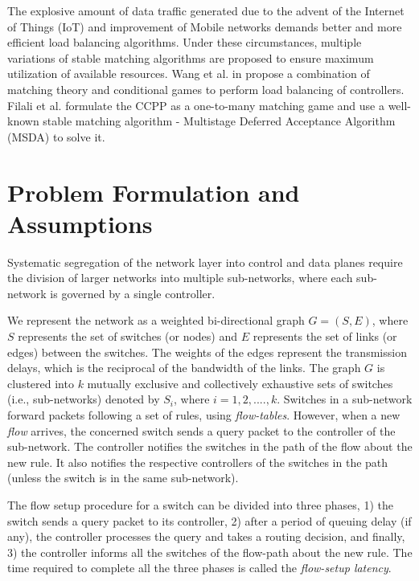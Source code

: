 \documentclass[a4paper,fleqn]{cas-dc}
\begin{document}
The explosive amount of data traffic generated due to the advent of the Internet of Things (IoT) and improvement of Mobile networks demands better and more efficient load balancing algorithms. Under these circumstances, multiple variations of stable matching algorithms are proposed to ensure maximum utilization of available resources. Wang et al. in \cite{wang2016load} propose a combination of matching theory and conditional games to perform load balancing of controllers. Filali et al. \cite{filali2018sdn} formulate the CCPP as a one-to-many matching game and use a well-known stable matching algorithm - Multistage Deferred Acceptance Algorithm (MSDA) \cite{fragiadakis2016matching} to solve it.

\section{Problem Formulation and Assumptions} \label{sysMod}
\noindent Systematic segregation of the network layer into control and data planes require the division of larger networks into multiple sub-networks, where each sub-network is governed by a single controller.

We represent the network as a weighted bi-directional graph $G=(S,E)$, where $S$ represents the set of switches (or nodes) and $E$ represents the set of links (or edges) between the switches. The weights of the edges represent the transmission delays, which is the reciprocal of the bandwidth of the links. The graph $G$ is clustered into $k$ mutually exclusive and collectively exhaustive sets of switches (i.e., sub-networks) denoted by $S_i$, where $i=1,2,....,k$. Switches in a sub-network forward packets following a set of rules, using \textit{flow-tables}. However, when a new \textit{flow} arrives, the concerned switch sends a query packet to the controller of the sub-network. The controller notifies the switches in the path of the flow about the new rule. It also notifies the respective controllers of the switches in the path (unless the switch is in the same sub-network).

The flow setup procedure for a switch can be divided into three phases, 1) the switch sends a query packet to its controller, 2) after a period of queuing delay (if any), the controller processes the query and takes a routing decision, and finally, 3) the controller informs all the switches of the flow-path about the new rule. The time required to complete all the three phases is called the \textit{flow-setup latency}.
\end{document}

